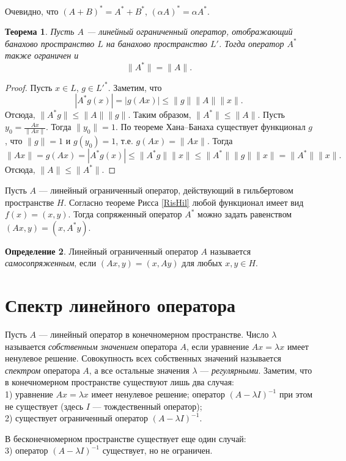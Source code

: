 \documentclass[12pt, titlepage, oneside]{amsbook}
\newtheorem{theorem}{Теорема}[chapter]
\theoremstyle{definition}
\newtheorem{definition}[theorem]{Определение}
\theoremstyle{remark}
\begin{document}
Очевидно, что $(A+B)^*=A^*+B^*$, $(\alpha A)^*=\alpha A^*$.

\begin{theorem}
\label{Op6}
Пусть $A$  --- линейный ограниченный оператор, отображающий банахово пространство $L$ на банахово пространство $L'$. Тогда оператор $A^*$ также ограничен и $$\|A^*\|=\|A\|.$$
\end{theorem}

\begin{proof}
Пусть $x\in L$, $g\in L'^*$. Заметим, что $$|A^*g(x)|=|g(Ax)|\leq\|g\|\|A\|\|x\|.$$ Отсюда, $\|A^*g\|\leq\|A\|\|g\|$. Таким образом, $\|A^*\|\leq\|A\|.$ Пусть $y_0=\frac{Ax}{\|Ax\|}$. Тогда $\|y_0\|=1$. По теореме Хана--Банаха существует функционал $g$, что $\|g\|=1$ и $g(y_0)=1$, т.е. $g(Ax)=\|Ax\|$. Тогда $$\|Ax\|=g(Ax)=|A^*g(x)|\leq\|A^*g\|\|x\|\leq \|A^*\| \|g\|\|x\|=\|A^*\|\|x\|.$$ Отсюда, $\|A\|\leq\|A^*\|$.
\end{proof}

Пусть $A$ --- линейный ограниченный оператор, действующий в гильбертовом пространстве $H$. Согласно теореме Рисса \ref{RisHil} любой функционал имеет вид $f(x)=(x,y)$. Тогда сопряженный оператор $A^*$ можно задать равенством $(Ax,y)=(x,A^*y)$.

 \begin{definition}
Линейный ограниченный оператор $A$ называется \emph{самосопряженным}, если $(Ax,y)=(x,Ay)$ для любых $x,y\in H$.
\end{definition}

\section{Спектр линейного оператора}

Пусть $A$ --- линейный оператор в конечномерном пространстве. Число $\lambda$ называется \emph{собственным значением} оператора $A$, если уравнение $Ax=\lambda x$ имеет ненулевое решение. Совокупность всех собственных значений называется \emph{спектром} оператора $A$, а все остальные значения $\lambda$ --- \emph{регулярными}. Заметим, что в конечномерном пространстве существуют лишь два случая:\\
1) уравнение $Ax=\lambda x$ имеет ненулевое решение; оператор $(A-\lambda I)^{-1}$ при этом не существует (здесь $I$ --- тождественный оператор);\\
2) существует ограниченный оператор $(A-\lambda I)^{-1}$.

В бесконечномерном пространстве существует еще один случай:\\
3) оператор $(A-\lambda I)^{-1}$ существует, но не ограничен.
\end{document}
